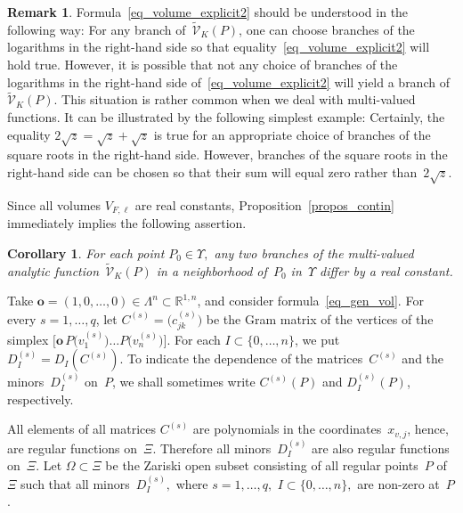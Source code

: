\documentclass[reqno,tbtags,12pt]{amsart}
\numberwithin{equation}{section}
\newcommand{\R}{\mathbb{R}}
\newcommand{\tCV}{\widetilde{\mathcal{V}}}
\newcommand{\bo}{\mathbf{o}}
\newcommand{\bell}{\boldsymbol{\ell}}
\newtheorem{cor}[theorem]{Corollary}
\theoremstyle{definition}
\newtheorem{remark}[theorem]{Remark}
\begin{document}
\begin{remark}
Formula~\eqref{eq_volume_explicit2} should be understood in the following way: For any branch of~$\tCV_K( P)$, one can choose  branches of the logarithms in the right-hand side  so that equality~\eqref{eq_volume_explicit2} will hold true. However, it is possible that not any choice of branches of the logarithms in the right-hand side of~\eqref{eq_volume_explicit2} will yield a branch of~$\tCV_K( P)$. This situation is rather common when we deal with multi-valued functions. It can be illustrated by the following simplest example: Certainly, the equality $2\sqrt{z}=\sqrt{z}+\sqrt{z}$ is true for an appropriate choice of branches of the square roots in the right-hand side. However, branches of the square roots in the right-hand side can be chosen so that their sum will equal zero rather than~$2\sqrt{z}$.
\end{remark}



Since all volumes $V_{F,\bell}$ are real constants, Proposition~\ref{propos_contin} immediately implies the following assertion.

\begin{cor}\label{cor_real_const}
For each point $ P_0\in \Upsilon,$ any two branches of the multi-valued analytic function~$\tCV_K( P)$ in a neighborhood of~$ P_0$ in~$\Upsilon$ differ by a real constant.
\end{cor}









Take $\bo=(1,0,\ldots,0)\in\Lambda^n\subset\R^{1,n}$, and consider formula~\eqref{eq_gen_vol}. 
For every $s=1,\ldots,q$, let $C^{(s)}=\bigl(c_{jk}^{(s)}\bigr)$ be the Gram matrix of the vertices of the simplex $\bigl[\bo\, P\bigl(v_1^{(s)}\bigr)\ldots P\bigl(v_n^{(s)}\bigr)\bigr]$. For each  $I\subset \{0,\ldots,n\}$, we put $D_I^{(s)}=D_I(C^{(s)})$. To indicate the dependence of the matrices~$C^{(s)}$ and the minors~$D_I^{(s)}$ on~$ P$, we shall sometimes write $C^{(s)}( P)$ and $D_I^{(s)}( P)$, respectively.

All elements of all matrices $C^{(s)}$ are polynomials in the coordinates~$x_{v,j}$, hence, are regular functions on~$\Xi$. Therefore all minors~$D_I^{(s)}$ are also regular functions on~$\Xi$. Let $\Omega\subset\Xi$ be the Zariski open subset consisting of all regular points~$P$ of~$\Xi$ such that all minors~$D_I^{(s)},$ where $s=1,\ldots,q,$  $I\subset\{0,\ldots,n\},$ are non-zero at~$ P$. 
\end{document}
